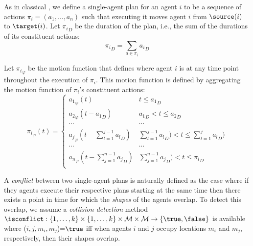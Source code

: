 
As in classical \mapf, we define a single-agent plan for an agent $i$ to be a sequence of actions $\pi_i=(a_1,\ldots, a_n)$ 
such that executing it moves agent $i$ from $\source(i)$ to $\target(i)$. 
Let ${\pi_i}_D$ be the duration of the plan, i.e., the sum of the durations of its constituent actions: \begin{equation}
    {\pi_i}_D=\sum_{a\in\pi_i} {a_i}_D
\end{equation}

Let ${\pi_i}_\varphi$ be the motion function that defines where agent $i$ is at any time point throughout the execution of $\pi_i$. This motion function is defined by aggregating the motion function of $\pi_i$'s constituent actions:
\begin{equation}
    {\pi_i}_\varphi(t)=
    \begin{cases}
        {a_1}_\varphi(t)  & t\leq {a_1}_D \\
        {a_2}_\varphi(t-{a_1}_D)  & {a_1}_D<t\leq {a_2}_D \\
        \cdots & \cdots  \\
        {a_j}_\varphi(t-\sum_{l=1}^{j-1}{a_l}_D)  & \sum_{l=1}^{j-1}{a_l}_D)<t\leq \sum_{l=1}^{j}{a_l}_D) \\
        \cdots & \cdots  \\
        {a_n}_\varphi(t-\sum_{j=1}^{n-1}{a_j}_D)  & \sum_{j=1}^{n-1}{a_j}_D)<t\leq {\pi_i}_D \\
    \end{cases}
\end{equation}


A \emph{conflict} between two single-agent plans is naturally defined as the case where if they agents execute their respective plans starting at the same time then there exists a point in time for which the \emph{shapes} of the agents overlap. 
To detect this overlap, we assume a \emph{collision-detection} method $\isconflict:\{1,\ldots,k\}\times \{1,\ldots,k\}
\times \mathcal{M}\times \mathcal{M}
\rightarrow \{\true,\false\}$ 
is available where \isconflict($i,j,m_i,m_j$)=$\true$ iff 
when agents $i$ and $j$ occupy locations $m_i$ and $m_j$, respectively, then their shapes overlap. 




